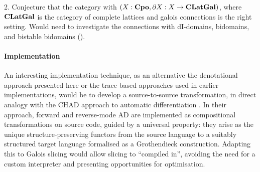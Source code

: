 2. Conjecture that the category with $(X : \mathbf{Cpo}, \partial X : X \to \mathbf{CLatGal})$, where $\mathbf{CLatGal}$ is the category of complete lattices and galois connections is the right setting. Would need to investigate the connections with dI-domains, bidomains, and bistable bidomains (\cite{laird07}).

\paragraph{Implementation}


An interesting implementation technique, as an alternative the denotational approach presented here or the
trace-based approaches used in earlier \GPS implementations, would be to develop a source-to-source
transformation, in direct analogy with the CHAD approach to automatic differentiation
\cite{vakar22,nunes2023}. In their approach, forward and reverse-mode AD are implemented as compositional
transformations on source code, guided by a universal property: they arise as the unique structure-preserving
functors from the source language to a suitably structured target language formalised as a Grothendieck
construction. Adapting this to Galois slicing would allow slicing to ``compiled in'', avoiding the need for a
custom interpreter and presenting opportunities for optimisation.
